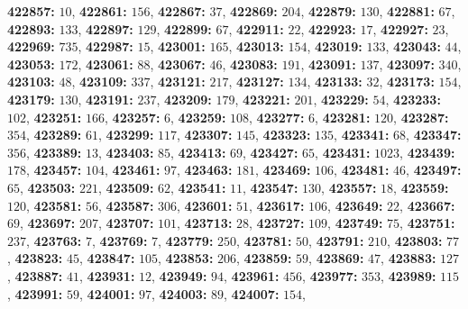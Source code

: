 \textsf{\bfseries 422857:} $10$, \textsf{\bfseries 422861:} $156$, \textsf{\bfseries 422867:} $37$, \textsf{\bfseries 422869:} $204$, \textsf{\bfseries 422879:} $130$, \textsf{\bfseries 422881:} $67$, \textsf{\bfseries 422893:} $133$, \textsf{\bfseries 422897:} $129$, \textsf{\bfseries 422899:} $67$, \textsf{\bfseries 422911:} $22$, \textsf{\bfseries 422923:} $17$, \textsf{\bfseries 422927:} $23$, \textsf{\bfseries 422969:} $735$, \textsf{\bfseries 422987:} $15$, \textsf{\bfseries 423001:} $165$, \textsf{\bfseries 423013:} $154$, \textsf{\bfseries 423019:} $133$, \textsf{\bfseries 423043:} $44$, \textsf{\bfseries 423053:} $172$, \textsf{\bfseries 423061:} $88$, \textsf{\bfseries 423067:} $46$, \textsf{\bfseries 423083:} $191$, \textsf{\bfseries 423091:} $137$, \textsf{\bfseries 423097:} $340$, \textsf{\bfseries 423103:} $48$, \textsf{\bfseries 423109:} $337$, \textsf{\bfseries 423121:} $217$, \textsf{\bfseries 423127:} $134$, \textsf{\bfseries 423133:} $32$, \textsf{\bfseries 423173:} $154$, \textsf{\bfseries 423179:} $130$, \textsf{\bfseries 423191:} $237$, \textsf{\bfseries 423209:} $179$, \textsf{\bfseries 423221:} $201$, \textsf{\bfseries 423229:} $54$, \textsf{\bfseries 423233:} $102$, \textsf{\bfseries 423251:} $166$, \textsf{\bfseries 423257:} $6$, \textsf{\bfseries 423259:} $108$, \textsf{\bfseries 423277:} $6$, \textsf{\bfseries 423281:} $120$, \textsf{\bfseries 423287:} $354$, \textsf{\bfseries 423289:} $61$, \textsf{\bfseries 423299:} $117$, \textsf{\bfseries 423307:} $145$, \textsf{\bfseries 423323:} $135$, \textsf{\bfseries 423341:} $68$, \textsf{\bfseries 423347:} $356$, \textsf{\bfseries 423389:} $13$, \textsf{\bfseries 423403:} $85$, \textsf{\bfseries 423413:} $69$, \textsf{\bfseries 423427:} $65$, \textsf{\bfseries 423431:} $1023$, \textsf{\bfseries 423439:} $178$, \textsf{\bfseries 423457:} $104$, \textsf{\bfseries 423461:} $97$, \textsf{\bfseries 423463:} $181$, \textsf{\bfseries 423469:} $106$, \textsf{\bfseries 423481:} $46$, \textsf{\bfseries 423497:} $65$, \textsf{\bfseries 423503:} $221$, \textsf{\bfseries 423509:} $62$, \textsf{\bfseries 423541:} $11$, \textsf{\bfseries 423547:} $130$, \textsf{\bfseries 423557:} $18$, \textsf{\bfseries 423559:} $120$, \textsf{\bfseries 423581:} $56$, \textsf{\bfseries 423587:} $306$, \textsf{\bfseries 423601:} $51$, \textsf{\bfseries 423617:} $106$, \textsf{\bfseries 423649:} $22$, \textsf{\bfseries 423667:} $69$, \textsf{\bfseries 423697:} $207$, \textsf{\bfseries 423707:} $101$, \textsf{\bfseries 423713:} $28$, \textsf{\bfseries 423727:} $109$, \textsf{\bfseries 423749:} $75$, \textsf{\bfseries 423751:} $237$, \textsf{\bfseries 423763:} $7$, \textsf{\bfseries 423769:} $7$, \textsf{\bfseries 423779:} $250$, \textsf{\bfseries 423781:} $50$, \textsf{\bfseries 423791:} $210$, \textsf{\bfseries 423803:} $77$, \textsf{\bfseries 423823:} $45$, \textsf{\bfseries 423847:} $105$, \textsf{\bfseries 423853:} $206$, \textsf{\bfseries 423859:} $59$, \textsf{\bfseries 423869:} $47$, \textsf{\bfseries 423883:} $127$, \textsf{\bfseries 423887:} $41$, \textsf{\bfseries 423931:} $12$, \textsf{\bfseries 423949:} $94$, \textsf{\bfseries 423961:} $456$, \textsf{\bfseries 423977:} $353$, \textsf{\bfseries 423989:} $115$, \textsf{\bfseries 423991:} $59$, \textsf{\bfseries 424001:} $97$, \textsf{\bfseries 424003:} $89$, \textsf{\bfseries 424007:} $154$, 
